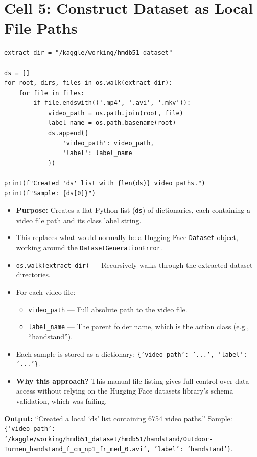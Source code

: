 \newpage
\section{Cell 5: Construct Dataset as Local File Paths}

\begin{lstlisting}
extract_dir = "/kaggle/working/hmdb51_dataset"

ds = []
for root, dirs, files in os.walk(extract_dir):
    for file in files:
        if file.endswith(('.mp4', '.avi', '.mkv')):
            video_path = os.path.join(root, file)
            label_name = os.path.basename(root)
            ds.append({
                'video_path': video_path,
                'label': label_name
            })

print(f"Created 'ds' list with {len(ds)} video paths.")
print(f"Sample: {ds[0]}")
\end{lstlisting}

\begin{explanation}
\begin{itemize}[nosep]
  \item \textbf{Purpose:} Creates a flat Python list (\texttt{ds}) of dictionaries, each containing a video file path and its class label string.
  \item This replaces what would normally be a Hugging Face \texttt{Dataset} object, working around the \texttt{DatasetGenerationError}.
  \item \texttt{os.walk(extract\_dir)} --- Recursively walks through the extracted dataset directories.
  \item For each video file:
  \begin{itemize}[nosep]
    \item \texttt{video\_path} --- Full absolute path to the video file.
    \item \texttt{label\_name} --- The parent folder name, which is the action class (e.g., ``handstand'').
  \end{itemize}
  \item Each sample is stored as a dictionary: \texttt{\{'video\_path': '...', 'label': '...'\}}.
  \item \textbf{Why this approach?} This manual file listing gives full control over data access without relying on the Hugging Face datasets library's schema validation, which was failing.
\end{itemize}
\textbf{Output:} ``Created a local `ds' list containing 6754 video paths.'' Sample: \texttt{\{'video\_path': '/kaggle/working/hmdb51\_dataset/hmdb51/handstand/Outdoor-Turnen\_handstand\_f\_cm\_np1\_fr\_med\_0.avi', 'label': 'handstand'\}}.
\end{explanation}

